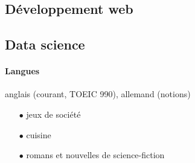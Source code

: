 \documentclass{cv}
\begin{document}
\noindent\begin{minipage}[t]{0.6\textwidth}

\subsection*{Développement web}

         

\end{minipage}\hspace{.5cm}
\begin{minipage}[t]{0.3\textwidth}

\subsection*{Data science}

   

\end{minipage}

\paragraph{Langues} anglais (courant, TOEIC 990), allemand (notions)



\begin{itemize}
\item[$\bullet$] jeux de société
\item[$\bullet$] cuisine
\item[$\bullet$] romans et nouvelles de science-fiction
\end{itemize}
\end{document}
